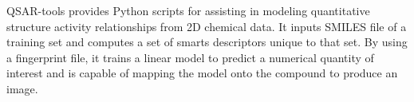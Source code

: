 QSAR-tools provides Python scripts for assisting in modeling quantitative structure activity relationships from 2D chemical data. It inputs SMILES file of a training set and computes a set of smarts descriptors unique to that set. By using a fingerprint file, it trains a linear model to predict a numerical quantity of interest and is capable of mapping the model onto the compound to produce an image.